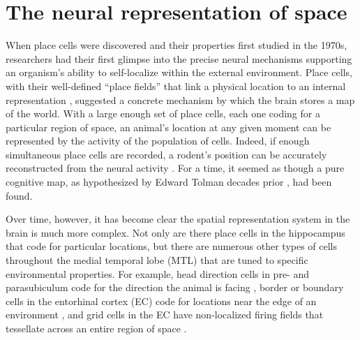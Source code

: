 
\section{The neural representation of space}


When place cells were discovered and their properties first studied in the 1970s, researchers had their first glimpse into the precise neural mechanisms supporting an organism's ability to self-localize within the external environment. Place cells, with their well-defined ``place fields'' that link a physical location to an internal representation \citep{OKeeNade78}, suggested a  concrete mechanism by which the brain stores a map of the world. With a large enough set of place cells, each one coding for a particular region of space, an animal's location at any given moment can be represented by the activity of the population of cells. Indeed, if enough simultaneous place cells are recorded, a rodent's position can be accurately reconstructed from the neural activity \citep{WilsMcNa93,ZhanEtal98}. For a time, it seemed as though a pure cognitive map, as hypothesized by Edward Tolman decades prior \citep{Tolm48}, had been found.

Over time, however, it has become clear the spatial representation system in the brain is much more complex. Not only are there place cells in the hippocampus that code for particular locations, but there are numerous other types of cells throughout the medial temporal lobe (MTL) that are tuned to specific environmental properties. For example, head direction cells in pre- and parasubiculum code for the direction the animal is facing \citep{TaubEtal90}, border or boundary cells in the entorhinal cortex (EC) code for locations near the edge of an environment \citep{SolsEtal08}, and grid cells in the EC have non-localized firing fields that tessellate across an entire region of space \citep{HaftEtal05}.

